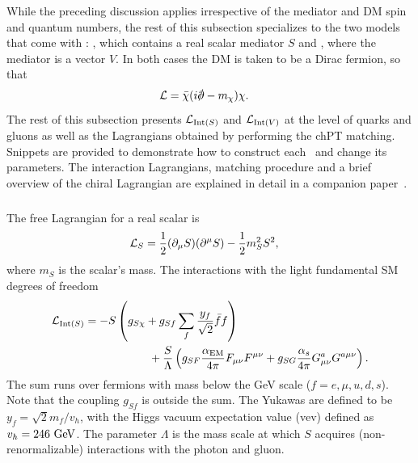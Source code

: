 While the preceding discussion applies irrespective of the mediator and DM spin and quantum numbers, the rest of this subsection specializes to the two models that come with \hazma: \sm, which contains a real scalar mediator $S$ and \vm, where the mediator is a vector $V$.
In both cases the DM is taken to be a Dirac fermion, so that
\begin{align}
    \L & = \bar{\chi} (i \slashed \d - m_\chi) \chi.
\end{align}
The rest of this subsection presents $\mathcal{L}_{{\mathrm{Int}}(S)}$ and $\mathcal{L}_{{\mathrm{Int}}(V)}$ at the level of quarks and gluons as well as the Lagrangians obtained by performing the chPT matching. Snippets are provided to demonstrate how to construct each \theory\ and change its parameters. The interaction Lagrangians, matching procedure and a brief overview of the chiral Lagrangian are explained in detail in a companion paper~\cite{matching_paper}.

\subsubsection{\sm}

The free Lagrangian for a real scalar is
\begin{align}
    \mathcal{L}_S & = \frac{1}{2} (\partial_\mu S) (\partial^\mu S) - \frac{1}{2} m_S^2 S^2,
\end{align}
where $m_S$ is the scalar's mass. The interactions with the light fundamental SM degrees of freedom
\begin{align}
    \mathcal{L}_{{\mathrm{Int}}(S)} & = -S \left( g_{S\chi} + g_{Sf} \sum_f \frac{y_f}{\sqrt{2}} \bar{f} f \right)                                                                                      \\
                    & \hspace{2cm} + \frac{S}{\Lambda} \left( g_{SF} \frac{\alpha_{\mathrm{EM}}}{4\pi} F_{\mu\nu} F^{\mu\nu} + g_{SG} \frac{\alpha_s}{4\pi} G_{\mu\nu}^a G^{a \mu\nu} \right).
\end{align}
The sum runs over fermions with mass below the GeV scale ($f = e, \mu, u, d, s$). Note that the coupling $g_{Sf}$ is outside the sum. The Yukawas are defined to be $y_f = \sqrt{2} m_f / v_h$, with the Higgs vacuum expectation value (vev) defined as $v_h = 246{~\mathrm{GeV}}$. The parameter $\Lambda$ is the mass scale at which $S$ acquires (non-renormalizable) interactions with the photon and gluon.

